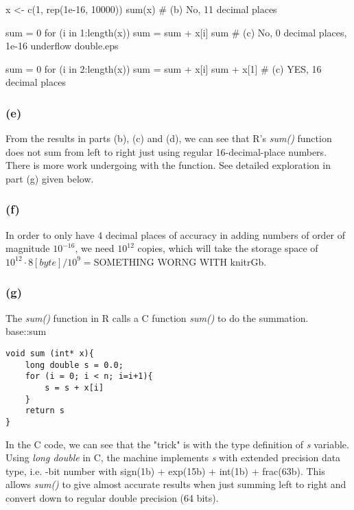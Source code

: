 \documentclass{article}
\newcommand{\rinline}[1]{SOMETHING WORNG WITH knitr}
\begin{document}
x <- c(1, rep(1e-16, 10000))
sum(x) # (b) No, 11 decimal places

sum = 0
for (i in 1:length(x))  sum = sum + x[i]
sum # (c) No, 0 decimal places, 1e-16 underflow double.eps

sum = 0
for (i in 2:length(x))  sum = sum + x[i]
sum + x[1] # (c) YES, 16 decimal places

\subsubsection*{(e)}
From the results in parts (b), (c) and (d), we can see that R's \textit{sum()} function does not sum
from left to right just using regular 16-decimal-place numbers. There is more work undergoing with the function.
See detailed exploration in part (g) given below.

\subsubsection*{(f)}
In order to only have 4 decimal places of accuracy in adding numbers of order of magnitude $10^{-16}$,
we need $10^{12}$ copies, which will take the storage space of $10^{12}\cdot 8[byte]/10^9 = $\rinline{1e12*8/1e9}Gb.

\subsubsection*{(g)}
The \textit{sum()} function in R calls a C function \textit{sum()} to do the summation.
base::sum
\begin{lstlisting}
void sum (int* x){
	long double s = 0.0;
	for (i = 0; i < n; i=i+1){
		s = s + x[i]
	}
	return s
}
\end{lstlisting}

In the C code, we can see that the "trick" is with the type definition of \textit{s} variable.
Using \textit{long double} in C, the machine implements \textit{s} with extended precision data type, i.e. -bit number with sign(1b) + exp(15b) + int(1b) + frac(63b). This allows \textit{sum()} to give
almost accurate results when just summing left to right and convert down to regular double precision (64 bits).





\newpage
\end{document}
